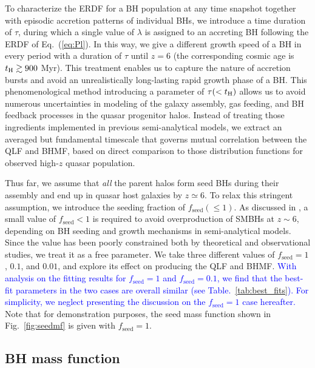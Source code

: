\documentclass[twocolumn, twocolappendix]{aastex63}
\newcommand{\tlife}{\tau}
\newcommand{\fseed}{f_\mathrm{seed}}
\newcommand{\blue}[1]{\textcolor{blue}{ #1}}
\begin{document}
\begin{CJK*}{UTF8}{gbsn}
To characterize the ERDF for a BH population at any time snapshot together with episodic 
accretion patterns of individual BHs, 
we introduce a time duration of $\tlife$, during which a single value of $\lambda$ is assigned to an accreting BH
following the ERDF of Eq.~(\ref{eq:Pl}).
In this way, we give a different growth speed of a BH in every period with a duration of $\tlife$ until $z=6$ 
(the corresponding cosmic age is $t_{\rm H}\gtrsim 900$ Myr).
This treatment enables us to capture the nature of accretion bursts and avoid an unrealistically 
long-lasting rapid growth phase of a BH.
This phenomenological method introducing a parameter of $\tlife(<t_{\rm H})$ allows us to avoid 
numerous uncertainties in modeling of the galaxy assembly, gas feeding, and BH feedback processes in the quasar 
progenitor halos.
Instead of treating those ingredients implemented in previous semi-analytical models, we extract 
an averaged but fundamental timescale that governs mutual correlation between the QLF and BHMF,
based on direct comparison to those distribution functions for observed high-$z$ quasar population.


Thus far, we assume that {\it all} the parent halos form seed BHs during their assembly and end up in quasar host galaxies by $z\simeq 6$.
To relax this stringent assumption, we introduce the seeding fraction of $\fseed (\leq 1)$.
As discussed in \citet{2009ApJ...696.1798T}, a small value of $\fseed <1$ is required to avoid overproduction of SMBHs at $z\sim 6$,
depending on BH seeding and growth mechanisms in semi-analytical models.
Since the value has been poorly constrained both by theoretical and observational studies, we treat it as a free parameter.
We take three different values of $\fseed = 1$, $0.1$, and $0.01$, and explore its effect on producing the QLF and BHMF.
\blue{
With analysis on the fitting results for $\fseed = 1$ and $\fseed = 0.1$,
we find that the best-fit parameters in the two cases are overall similar (see Table.~\ref{tab:best_fits}). 
For simplicity, we neglect presenting the discussion on the $\fseed=1$ case hereafter.
}
Note that for demonstration purposes, the seed mass function shown in Fig.~\ref{fig:seedmf} is given with $\fseed = 1$.



\subsection{BH mass function}\label{sec:MF}


\end{CJK*}
\end{document}
